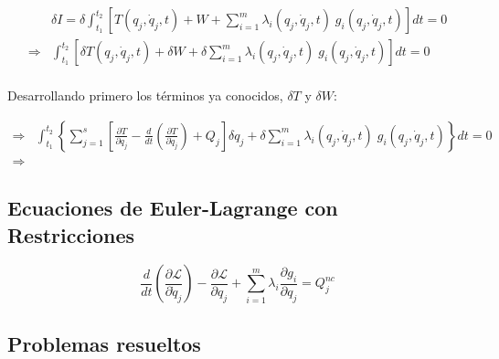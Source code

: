 \documentclass[/home/hernan/Documentos/Apuntes_mecanica_teorica/main.tex]{subfiles}
\begin{document}
    \begin{align*}
        & \delta I = \delta  \int_{t_1}^{t_2} \left[ T\left(q_{j}, \dot{q}_{j}, t\right) + W + \sum_{i=1}^{m} \lambda_{i}\left(q_{j}, \dot{q}_{j}, t \right) \; g_{i}\left(q_{j}, \dot{q}_{j}, t \right) \right] dt = 0 \\ 
        \Rightarrow & \int_{t_1}^{t_2} \left[ \delta T\left(q_{j}, \dot{q}_{j}, t\right) + \delta  W + \delta \sum_{i=1}^{m} \lambda_{i}\left(q_{j}, \dot{q}_{j}, t \right) \; g_{i}\left(q_{j}, \dot{q}_{j}, t \right) \right] dt = 0 \\ 
    \end{align*}

    Desarrollando primero los términos ya conocidos, $\delta T$ y $\delta W$:

    \begin{align*}
        \Rightarrow &  \int_{t_1}^{t_2} \left\{ \sum_{j=1}^{s} \left[ \frac{\partial T}{\partial q_{j}}  - \frac{d}{d t} \left(\frac{\partial T}{\partial \dot{q}_{j}} \right) + Q_{j} \right] \delta q_{j}  + \delta \sum_{i=1}^{m} \lambda_{i}\left(q_{j}, \dot{q}_{j}, t \right) \; g_{i}\left(q_{j}, \dot{q}_{j}, t \right)\right\} dt = 0 \\ 
        \Rightarrow & 
    \end{align*}


    \subsection{Ecuaciones de Euler-Lagrange con Restricciones}
    \begin{definition}
        \begin{equation}
            \frac{d}{d t} \left(\frac{\partial \mathcal{L} }{\partial \dot{q}_{j}} \right) - \frac{\partial \mathcal{L}}{\partial q_{j}} + \sum_{i=1}^{m}\lambda_{i} \frac{\partial g_{i}}{\partial q_{j}}=  Q_{j}^{nc}
        \end{equation}
    \end{definition}


    \subsection{Problemas resueltos}
    
\end{document}
